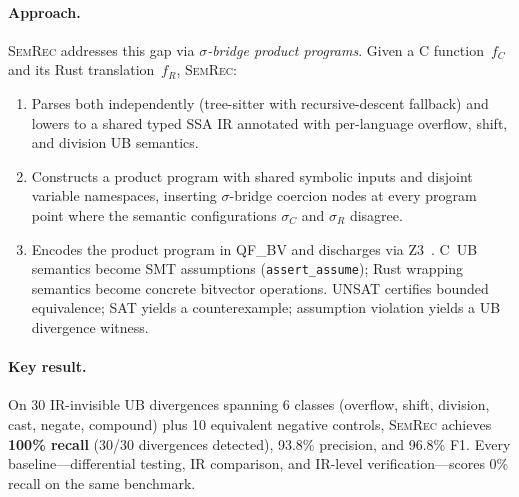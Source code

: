 \documentclass[10pt,a4paper]{article}
\begin{document}
\paragraph{Approach.}
\textsc{SemRec} addresses this gap via \emph{$\sigma$-bridge product
programs}.  Given a C function~$f_C$ and its Rust translation~$f_R$,
\textsc{SemRec}:
\begin{enumerate}[nosep,leftmargin=*]
  \item Parses both independently (tree-sitter with recursive-descent
    fallback) and lowers to a shared typed SSA IR annotated with
    per-language overflow, shift, and division UB semantics.
  \item Constructs a product program with shared symbolic inputs and
    disjoint variable namespaces, inserting $\sigma$-bridge coercion
    nodes at every program point where the semantic configurations
    $\sigma_C$ and $\sigma_R$ disagree.
  \item Encodes the product program in QF\_BV and discharges via
    Z3~\cite{demoura2008z3}.  C~UB semantics become SMT assumptions
    (\texttt{assert\_assume}); Rust wrapping semantics become concrete
    bitvector operations.  UNSAT certifies bounded equivalence; SAT
    yields a counterexample; assumption violation yields a UB
    divergence witness.
\end{enumerate}

\paragraph{Key result.}
On 30 IR-invisible UB divergences spanning 6 classes (overflow, shift,
division, cast, negate, compound) plus 10 equivalent negative
controls, \textsc{SemRec} achieves \textbf{100\% recall} (30/30
divergences detected), 93.8\% precision, and 96.8\% F1.  Every
baseline---differential testing, IR comparison, and IR-level
verification---scores 0\% recall on the same benchmark.
\end{document}
